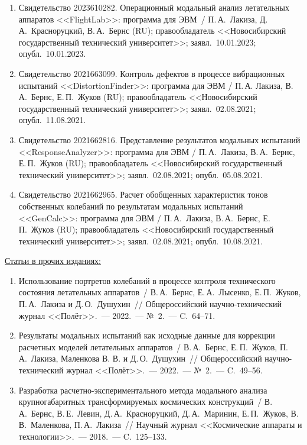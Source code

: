 \begin{enumerate}
	\item Свидетельство 2023610282. Операционный модальный анализ летательных аппаратов <<FlightLab>>: программа для ЭВМ~/ П.\,А.~Лакиза, Д.\,А.~Красноруцкий, В.\,А.~Бернс (RU); правообладатель <<Новосибирский государственный технический университет>>; заявл.~10.01.2023; опубл.~10.01.2023.
	\item Свидетельство 2021663099. Контроль дефектов в процессе вибрационных испытаний <<DistortionFinder>>: программа для ЭВМ / П.\,А. Лакиза, В.\,А.~Бернс, Е.\,П.~Жуков (RU); правообладатель <<Новосибирский государственный технический университет>>; заявл.~02.08.2021; опубл.~11.08.2021.
 	\item Свидетельство 2021662816. Представление результатов модальных испытаний <<ResponseAnalyzer>>: программа для ЭВМ / П.\,А.~Лакиза, В.\,А.~Бернс, Е.\,П.~Жуков (RU); правообладатель <<Новосибирский государственный технический университет>>; заявл.~02.08.2021; опубл.~05.08.2021.
	\item Свидетельство 2021662965. Расчет обобщенных характеристик тонов собственных колебаний по результатам модальных испытаний <<GenCalc>>: программа для ЭВМ / П.\,А.~Лакиза, В.\,А.~Бернс, Е.\,П.~Жуков (RU); правообладатель <<Новосибирский государственный технический университет>>; заявл.~02.08.2021; опубл.~10.08.2021.
\end{enumerate}

\ul{Статьи в прочих изданиях:}

\begin{enumerate}
	\item Использование портретов колебаний в процессе контроля технического состояния летательных аппаратов~/ В.\,А.~Бернс, Е.\,А.~Лысенко, Е.\,П.~Жуков, П.\,А.~Лакиза и Д.\,О.~Душухин~// Общероссийский научно-технический журнал <<Полёт>>.~--- 2022.~--- №~2.~--- C.~64--71.
	\item Результаты модальных испытаний как исходные данные для коррекции расчетных моделей летательных аппаратов~/ В.\,А.~Бернс, Е.\,П.~Жуков, П.\,А.~Лакиза, Маленкова В. В. и Д.\,О.~Душухин~// Общероссийский научно-технический журнал <<Полёт>>.~--- 2022.~--- №~2.~--- C.~49--56.
	\item Разработка расчетно-экспериментального метода модального анализа крупногабаритных трансформируемых космических конструкций~/ В.\,А.~Бернс, В.\,Е.~Левин, Д.\,А.~Красноруцкий, Д.\,А.~Маринин, Е.\,П.~Жуков, В.\,В.~Маленкова, П.\,А.~Лакиза~// Научный журнал <<Космические аппараты и технологии>>.~--- 2018.~--- C.~125--133.
\end{enumerate}